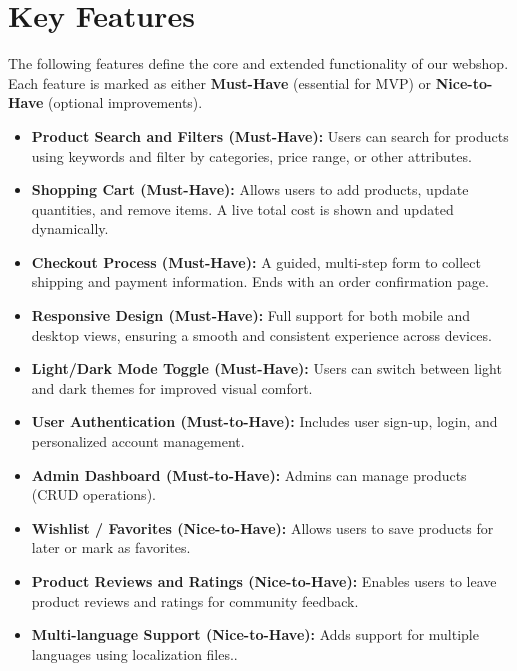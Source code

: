 \documentclass[a4paper,12pt]{article}
\begin{document}
	
	
	\section{Key Features}

The following features define the core and extended functionality of our webshop. Each feature is marked as either \textbf{Must-Have} (essential for MVP) or \textbf{Nice-to-Have} (optional improvements).

\begin{itemize}
    \item \textbf{Product Search and Filters (Must-Have):}  
    Users can search for products using keywords and filter by categories, price range, or other attributes.
    
    \item \textbf{Shopping Cart (Must-Have):}  
    Allows users to add products, update quantities, and remove items. A live total cost is shown and updated dynamically.
    
    \item \textbf{Checkout Process (Must-Have):}  
    A guided, multi-step form to collect shipping and payment information. Ends with an order confirmation page.
    
    \item \textbf{Responsive Design (Must-Have):}  
    Full support for both mobile and desktop views, ensuring a smooth and consistent experience across devices.
    
    \item \textbf{Light/Dark Mode Toggle (Must-Have):}  
    Users can switch between light and dark themes for improved visual comfort.
    
    \item \textbf{User Authentication (Must-to-Have):}
    Includes user sign-up, login, and personalized account management.
    
    \item \textbf{Admin Dashboard (Must-to-Have):}
    Admins can manage products (CRUD operations).


    \item \textbf{Wishlist / Favorites (Nice-to-Have):}  
    Allows users to save products for later or mark as favorites.


    \item \textbf{Product Reviews and Ratings (Nice-to-Have):}  
    Enables users to leave product reviews and ratings for community feedback.

    \item \textbf{Multi-language Support (Nice-to-Have):}  
    Adds support for multiple languages using localization files..
    
\end{itemize}
\end{document}
